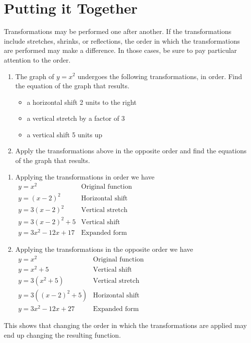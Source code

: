 \documentclass[handout, noauthor, nooutcomes]{ximera}
\begin{document}
\section{Putting it Together}
Transformations may be performed one after another. If the transformations include stretches, shrinks, or reflections, the order in which the transformations are performed may make a difference. In those cases, be sure to pay particular attention to the order.

\begin{example}
\begin{enumerate}
\item The graph of $y=x^2$ undergoes the following transformations, in order. Find the equation of the graph that results.
\begin{itemize}
\item a horizontal shift 2 units to the right
\item a vertical stretch by a factor of 3
\item a vertical shift 5 units up
\end{itemize}
\item Apply the transformations above in the opposite order and find the equations of the graph that results.
\end{enumerate}
\begin{explanation}
\begin{enumerate}
\item Applying the transformations in order we have\\
$
\begin{array}{lc}
y = x^2& \text{Original function}\\
y = (x-2)^2& \text{Horizontal shift} \\
y = 3(x-2)^2& \text{Vertical stretch} \\
y = 3(x-2)^2+5& \text{Vertical shift}\\
y = 3x^2 - 12x + 17& \text{Expanded form}
\end{array}
$
\item Applying the transformations in the opposite order we have\\
$
\begin{array}{lc}
y = x^2& \text{Original function}\\
y = x^2 + 5 & \text{Vertical shift} \\
y = 3(x^2+5)& \text{Vertical stretch} \\
y = 3((x-2)^2+5) & \text{Horizontal shift}\\
y = 3x^2 - 12x + 27& \text{Expanded form}
\end{array}
$
\end{enumerate}
This shows that changing the order in which the transformations are applied may end up changing the resulting function. 
\end{explanation}
\end{example}
\end{document}
